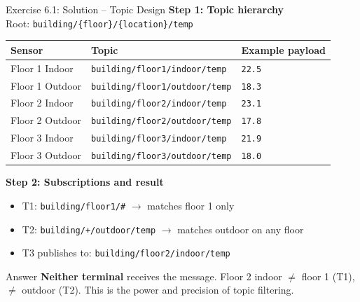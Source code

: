 \documentclass[aspectratio=169,11pt]{beamer}
\begin{document}
\begin{frame}{Exercise 6.1: Solution -- Topic Design}
    \textbf{Step 1: Topic hierarchy}\\
    Root: \texttt{building/\{floor\}/\{location\}/temp}

    \vspace{0.1cm}
    \begin{center}
    \footnotesize
    \begin{tabular}{lll}
        \toprule
        \textbf{Sensor} & \textbf{Topic} & \textbf{Example payload} \\
        \midrule
        Floor 1 Indoor & \texttt{building/floor1/indoor/temp} & \texttt{22.5} \\
        Floor 1 Outdoor & \texttt{building/floor1/outdoor/temp} & \texttt{18.3} \\
        Floor 2 Indoor & \texttt{building/floor2/indoor/temp} & \texttt{23.1} \\
        Floor 2 Outdoor & \texttt{building/floor2/outdoor/temp} & \texttt{17.8} \\
        Floor 3 Indoor & \texttt{building/floor3/indoor/temp} & \texttt{21.9} \\
        Floor 3 Outdoor & \texttt{building/floor3/outdoor/temp} & \texttt{18.0} \\
        \bottomrule
    \end{tabular}
    \normalsize
    \end{center}

    \vspace{0.2cm}
    \textbf{Step 2: Subscriptions and result}
    \begin{itemize}
        \item T1: \texttt{building/floor1/\#} $\rightarrow$ matches floor 1 only
        \item T2: \texttt{building/+/outdoor/temp} $\rightarrow$ matches outdoor on any floor
        \item T3 publishes to: \texttt{building/floor2/indoor/temp}
    \end{itemize}

    \begin{alertblock}{Answer}
        \textbf{Neither terminal} receives the message. Floor 2 indoor $\neq$ floor 1 (T1), $\neq$ outdoor (T2). This is the power and precision of topic filtering.
    \end{alertblock}
\end{frame}
\end{document}
